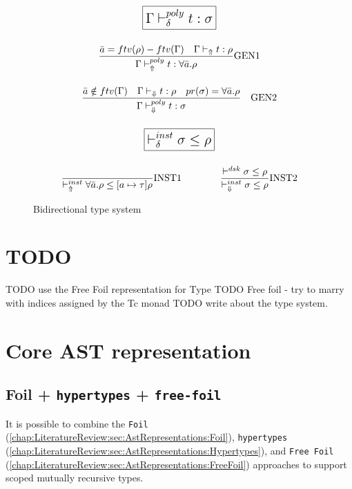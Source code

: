 \begin{figure}[h]
\begin{tcolorbox}[breakable, colback=white]
\begin{gather*}
      \\[\bigskipamount]
      \boxed{\mlg{\Gamma \Qquad \mexp{\vdash_\delta^{poly} t : \sigma}}}
      \\[\bigskipamount]
      \frac{\mexp{\bar{a}} = \mexp{ftv}(\rho) - \mexp{ftv}(\Gamma) \quad \Gamma \Qquad \mexp{\vdash_\Uparrow t : \rho}}{\Gamma \Qquad \mexp{\vdash_\Uparrow^{poly} t : \forall \bar{a}.\rho}} \text{GEN1}
      \\[\bigskipamount]
      \frac{\mexp{\bar{a}} \notin \mexp{ftv}(\Gamma) \quad \Gamma \Qquad \mexp{\vdash_\Downarrow t : \rho \quad pr(\sigma) = \forall \bar{a}.\rho}}{\Gamma \Qquad \mexp{\vdash_\Downarrow^{poly} t : \sigma}} \quad \text{GEN2}
      \\[\bigskipamount]
      \boxed{\mlg{\mexp{\vdash_\delta^{inst} \sigma \leq \rho}}}
      \\[\bigskipamount]
      \frac{}{\mexp{\vdash_\Uparrow^{inst} \forall \bar{a}.\rho \leq [a \mapsto \tau] \rho}} \text{INST1}
      \qquad \qquad
      \frac{\mexp{\vdash^{dsk} \sigma \leq \rho}}{\mexp{\vdash_\Downarrow^{inst} \sigma \leq \rho}} \text{INST2}
    \end{gather*}
  \end{tcolorbox}
  \caption{Bidirectional type system}
  \label{fig:TypeSystem}
\end{figure}

\section{TODO}

TODO use the Free Foil representation for Type
TODO Free foil - try to marry with indices assigned by the Tc monad
TODO write about the type system.

\section{Core AST representation}

\subsection{Foil + \texttt{hypertypes} + \texttt{free-foil}}

It is possible to combine the \texttt{Foil} (\cref{chap:LiteratureReview:sec:AstRepresentations:Foil}), \texttt{hypertypes} (\cref{chap:LiteratureReview:sec:AstRepresentations:Hypertypes}), and \texttt{Free Foil} (\cref{chap:LiteratureReview:sec:AstRepresentations:FreeFoil}) approaches to support scoped mutually recursive types.

